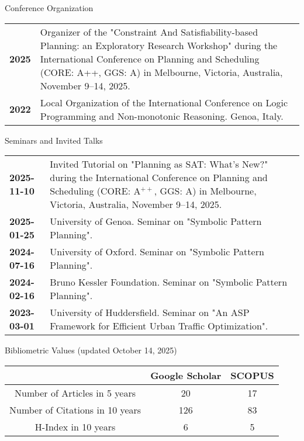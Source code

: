 \documentclass{resume} %
\begin{document}
   \begin{rSection}{Conference Organization}
	\begin{tabularx}{0.95\textwidth} {lp{14cm}}
 \textbf{2025} & Organizer of the "Constraint And Satisfiability-based Planning: an Exploratory Research Workshop" during the International Conference on Planning and Scheduling (CORE: A++, GGS: A) in Melbourne, Victoria, Australia, November 9–14, 2025. \\
  \textbf{2022} & Local Organization of the International Conference on Logic Programming and Non-monotonic Reasoning. Genoa, Italy.
  \end{tabularx}
 \end{rSection}

\break
 \begin{rSection}{Seminars and Invited Talks}
 	\begin{tabularx}{0.95\textwidth} {lp{14cm}}
 \textbf{2025-11-10} & Invited Tutorial on "Planning as SAT: What's New?" during the International Conference on Planning and Scheduling (CORE: A$^{++}$, GGS: A) in Melbourne, Victoria, Australia, November 9–14, 2025.\\
  \textbf{2025-01-25} & University of Genoa. Seminar on "Symbolic Pattern Planning".\\
 \textbf{2024-07-16} & University of Oxford. Seminar on "Symbolic Pattern Planning".\\
 \textbf{2024-02-16} & Bruno Kessler Foundation. Seminar on "Symbolic Pattern Planning".\\
 \textbf{2023-03-01} & University of Huddersfield. Seminar on "An ASP Framework for Efficient Urban Traffic Optimization".\\
 \end{tabularx}

\end{rSection}

\begin{rSection}{Bibliometric Values \tiny{(updated October 14, 2025)}}
\begin{center}
	
\begin{tabular}{ccc}

 & Google Scholar & SCOPUS \\ \hline
\multicolumn{1}{c}{Number of Articles in 5 years} & 20 & 17 \\ \hline
\multicolumn{1}{c}{Number of Citations in 10 years} & 126 & 83 \\ \hline
\multicolumn{1}{c}{H-Index in 10 years} & 
6 & 5 \\ 
\end{tabular}%
\end{center}
\end{rSection}
\end{document}

